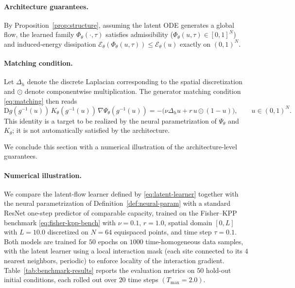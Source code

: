 \documentclass[11pt]{article}
\newcommand{\cE}{\mathcal{E}}
\newcommand{\PhiT}{\Phi_{\theta}}
\begin{document}
\paragraph{Architecture guarantees.}
By Proposition~\ref{prop:structure}, assuming the latent ODE generates a global flow, the learned family \(\PhiT(\cdot,\tau)\) satisfies admissibility (\(\PhiT(u,\tau)\in[0,1]^N\)) and induced-energy dissipation \(\cE_{\theta}(\PhiT(u,\tau))\le\cE_{\theta}(u)\) exactly on \((0,1)^N\).

\paragraph{Matching condition.}
Let \(\Delta_h\) denote the discrete Laplacian corresponding to the spatial discretization and \(\odot\) denote componentwise multiplication. The generator matching condition \eqref{eq:matching} then reads
\begin{equation}\label{eq:matching-fisher}
\mathrm{D}g(g^{-1}(u))\,K_{\theta}(g^{-1}(u))\,\nabla\Psi_{\theta}(g^{-1}(u)) = -\bigl(\nu\Delta_h u + r\,u\odot(1-u)\bigr),\qquad u\in(0,1)^N.
\end{equation}
This identity is a target to be realized by the neural parametrization of \(\Psi_{\theta}\) and \(K_{\theta}\); it is not automatically satisfied by the architecture.

We conclude this section with a numerical illustration of the architecture-level guarantees.

\paragraph{Numerical illustration.}
We compare the latent-flow learner defined by \eqref{eq:latent-learner} together with the neural parametrization of Definition~\ref{def:neural-param} with a standard ResNet one-step predictor of comparable capacity, trained on the Fisher--KPP benchmark \eqref{eq:fisher-kpp-bench} with \(\nu=0.1\), \(r=1.0\), spatial domain \([0,L]\) with \(L=10.0\) discretized on \(N=64\) equispaced points, and time step \(\tau=0.1\). Both models are trained for \(50\) epochs on \(1000\) time-homogeneous data samples, with the latent learner using a local interaction mask (each site connected to its \(4\) nearest neighbors, periodic) to enforce locality of the interaction gradient. Table~\ref{tab:benchmark-results} reports the evaluation metrics on \(50\) hold-out initial conditions, each rolled out over \(20\) time steps \((T_{\max}=2.0)\).
\end{document}

